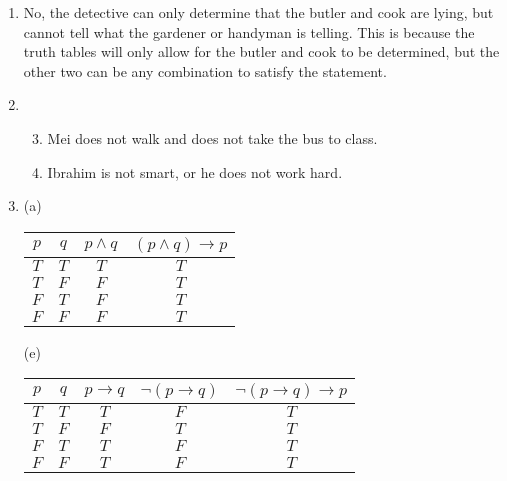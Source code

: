 \documentclass{article}
\begin{document}
\begin{enumerate}
 (e) \begin{tabular}{|c|c|c|c|c|c|}
 	\hline
	$p$ & $q$ & $\neg p$ & $p \iff q$ & $\neg p \iff q$ & $(p \iff q) \lor (\neg p \iff q)$ \\ \hline
	$T$ & $T$ & $F$ & $T$ & $F$ & $T$ \\ \hline	
	$T$ & $F$ & $F$ & $F$ & $T$ & $T$ \\ \hline	
	$F$ & $T$ & $T$ & $F$ & $T$ & $T$ \\ \hline	
	$F$ & $F$ & $T$ & $T$ & $F$ & $T$ \\ \hline
	\end{tabular}

\item
 No, the detective can only determine that the butler and cook are lying, but cannot tell what the gardener or handyman is telling.  This is because the truth tables will only allow for the butler and cook to be determined, but the other two can be any combination to satisfy the statement.

\item
 \begin{enumerate}
 \setcounter{enumii}{2}
  \item Mei does not walk and does not take the bus to class.
  \item Ibrahim is not smart, or he does not work hard.
 \end{enumerate}

\item 
 (a) \begin{tabular}{|c|c|c|c|}
	\hline
	$p$ & $q$ & $p \land q$ & $(p \land q) \rightarrow p$ \\ \hline
	$T$ & $T$ & $T$ & $T$ \\ \hline
	$T$ & $F$ & $F$ & $T$ \\ \hline
	$F$ & $T$ & $F$ & $T$ \\ \hline
	$F$ & $F$ & $F$ & $T$ \\ \hline
     \end{tabular}

 (e) \begin{tabular}{|c|c|c|c|c|}	
	\hline
	$p$ & $q$ & $p \rightarrow q$ & $\neg(p \rightarrow q)$ & $\neg(p \rightarrow q) \rightarrow p$ \\ \hline
	$T$ & $T$ & $T$ & $F$ & $T$ \\ \hline
	$T$ & $F$ & $F$ & $T$ & $T$ \\ \hline
	$F$ & $T$ & $T$ & $F$ & $T$ \\ \hline
	$F$ & $F$ & $T$ & $F$ & $T$ \\ \hline
     \end{tabular}


\end{enumerate}
\end{document}
